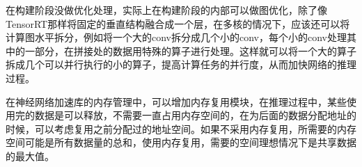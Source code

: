 在构建阶段没做优化处理，实际上在构建阶段的内部可以做图优化，除了像TensorRT那样将固定的垂直结构融合成一个层，在多核的情况下，应该还可以将计算图水平拆分，例如将一个大的conv拆分成几个小的conv，每个小的conv处理其中的一部分，在拼接处的数据用特殊的算子进行处理。这样就可以将一个大的算子拆成几个可以并行执行的小的算子，提高计算任务的并行度，从而加快网络的推理过程。

在神经网络加速库的内存管理中，可以增加内存复用模块，在推理过程中，某些使用完的数据是可以释放，不需要一直占用内存空间的，在为后面的数据分配地址的时候，可以考虑复用之前分配过的地址空间。如果不采用内存复用，所需要的内存空间可能是所有数据量的总和，使用内存复用，需要的空间理想情况下是共享数据的最大值。
